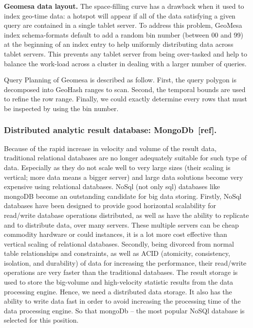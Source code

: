\documentclass{acm_proc_article-sp}
\begin{document}
\textbf{Geomesa data layout.} The space-filling curve has a drawback when it used to index geo-time data: a hotspot will appear if all of the data satisfying a given query are contained in a single tablet server. To address this problem, GeoMesa index schema-formats default to add  a random bin number (between 00 and 99) at the beginning of an index entry to help uniformly distributing data across tablet servers. This prevents any tablet server from being over-tasked and help to balance the work-load across a cluster in dealing with a larger number of queries.

\setlength{\parindent}{0.7cm} Query Planning of Geomesa is described as follow. First, the query polygon is decomposed into GeoHash ranges to scan. Second, the temporal bounds are used to refine the row range. Finally, we could exactly determine every rows that must be inspected by using the bin number.


\subsubsection{Distributed analytic result database: MongoDb~[ref].}
Because of the rapid increase in velocity and volume of the result data, traditional relational databases are no longer adequately suitable for such type of data. Especially as they do not scale well to very large sizes (their scaling is vertical; more data means a bigger server) and large data solutions become very expensive using relational databases. NoSql (not only sql) databases like mongoDB become an outstanding candidate for big data storing. Firstly, NoSql databases have been designed to provide good horizontal scalability for read/write database operations distributed, as well as  have the ability to replicate and to distribute data, over many servers. These multiple servers can be cheap commodity hardware or could instances, it is a lot more cost effective than vertical scaling of relational databases. Secondly, being divorced from normal table relationships and constraints, as well as ACID (atomicity, consistency, isolation, and durability) of data for increasing the performance, their read/write operations are very faster than the traditional databases. 
The result storage is used to store the big-volume and high-velocity statistic results from the data processing engine. Hence, we need a distributed data storage. It also has the ability to write data fast in order to avoid increasing the processing time of the data processing engine. So that mongoDb – the most popular NoSQl database is selected for this position.
\end{document}
